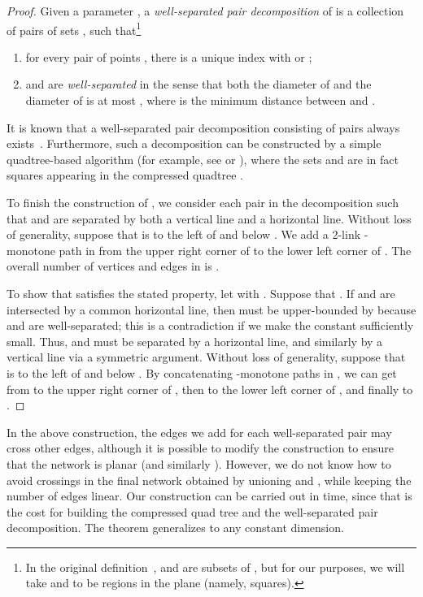 \documentclass[11pt]{article}
\begin{document}
\begin{proof}
Given a parameter ,
a {\em well-separated pair decomposition\/} of  is
a collection of pairs of sets ,
such that\footnote{
In the original definition~\cite{CalKos},  and  are subsets of ,
but for our purposes, we will take  and  to be regions in the plane
(namely, squares).
}
\begin{enumerate}
\item for every pair of points , there is a unique index 
with  or ;
\item  and  are {\em well-separated\/} in the sense that
both the diameter of  and the diameter of  is at most
, where  is the minimum distance between  and .
\end{enumerate}
It is known that a well-separated pair decomposition consisting
of  pairs always exists~\cite{CalKos}.
Furthermore, such a decomposition
can be constructed by a simple quadtree-based algorithm (for example, see
\cite{Har-Peled:book} or \cite{Chan:wspd}), where the sets  and 
are in fact squares appearing in the compressed quadtree .

To finish the construction of , we consider each pair  in the
decomposition such that  and  are separated by both a vertical line
and a horizontal line.
Without loss of generality, suppose that  is to the left of and below .
We add a 2-link -monotone path in  from the upper right
corner of  to the lower left corner of .
The overall number of vertices and edges in  is .

To show that  satisfies the stated property, let 
with .
Suppose that .
If  and  are intersected by a common horizontal line, then
 must be upper-bounded by  because  and 
are well-separated; this is a contradiction
if we make the constant  sufficiently small.
Thus,  and  must be separated by a horizontal line, and similarly
by a vertical line via a symmetric argument.
Without loss of generality, suppose that  is to the left of and below .
By concatenating -monotone paths in , we can get from 
to the upper right corner of , then to the lower left corner of ,
and finally to .
\end{proof}

In the above construction, the edges
we add for each well-separated pair  may cross other edges, although
it is possible to modify the construction to
ensure that the network  is planar (and similarly ).  However, we do not
know how to avoid crossings in the final network
obtained by unioning  and , while keeping the number of edges linear.
Our construction can be carried out in  time, since that is the cost for building the compressed quad tree and the  well-separated pair decomposition.  The theorem generalizes to any constant dimension.
\end{document}
